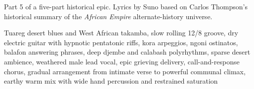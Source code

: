 
\begin{notes}
Part 5 of a five-part historical epic. Lyrics by Suno based on Carlos Thompson's historical summary of the \emph{African Empire} alternate-history universe.
\end{notes}
\begin{style}
Tuareg desert blues and West African takamba, slow rolling 12/8 groove, dry electric guitar with hypnotic pentatonic riffs, kora arpeggios, ngoni ostinatos, balafon answering phrases, deep djembe and calabash polyrhythms, sparse desert ambience, weathered male lead vocal, epic grieving delivery, call-and-response chorus, gradual arrangement from intimate verse to powerful communal climax, earthy warm mix with wide hand percussion and restrained saturation
\end{style}
